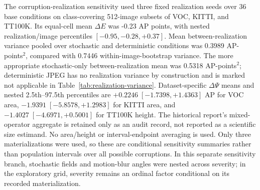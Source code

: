 \documentclass[10pt]{article}
\newcommand{\DeltaE}{\Delta E}
\newcommand{\DeltaPsi}{\Delta\Psi}
\begin{document}
The corruption-realization sensitivity used three fixed realization seeds over
36 base conditions on class-covering 512-image subsets of VOC, KITTI, and
TT100K. Its equal-cell mean $\DeltaE$ was -0.23 AP points, with nested
realization/image percentiles $[-0.95,-0.28,+0.37]$. Mean between-realization
variance pooled over stochastic and deterministic conditions was 0.3989
AP-points$^2$, compared with 0.7446 within-image-bootstrap variance. The more
appropriate stochastic-only between-realization mean was 0.5318
AP-points$^2$; deterministic JPEG has no realization variance by construction
and is marked not applicable in Table~\ref{tab:realization-variance}. Dataset-specific
$\DeltaPsi$ means and nested 2.5th--97.5th percentiles are
$+0.2246\;[-1.7398,+1.4363]$ AP for VOC area,
$-1.9391\;[-5.8578,+1.2983]$ for KITTI area, and
$-1.4027\;[-4.6971,+0.5001]$ for TT100K height. The historical report's
mixed-operator aggregate is retained only as an audit record, not reported as a
scientific size estimand. No area/height or interval-endpoint averaging is used.
Only three materializations were used, so these are
conditional sensitivity summaries rather than population intervals over all
possible corruptions. In this separate sensitivity branch, stochastic fields
and motion-blur angles were nested across severity; in the exploratory grid,
severity remains an ordinal factor conditional on its recorded materialization.

\begin{table}[htbp]
\centering
\caption{Realization-specific direct interactions. All-object $\Delta E$ uses
36 cells per label. Area $\DeltaPsi$ uses the 24 VOC/KITTI cells and height
$\DeltaPsi$ the 12 TT100K cells per label; the two operators are not pooled.
SD is the descriptive standard deviation across three fixed labels.}
\label{tab:realization-seeds}
\small
\resizebox{0.82\textwidth}{!}{}
\end{table}

\begin{table}[htbp]
\centering
\caption{Per-corruption realization sensitivity. Variances are in squared AP
points. JPEG is deterministic and is excluded from the stochastic-only mean.}
\label{tab:realization-variance}
\small
\resizebox{0.92\textwidth}{!}{}
\end{table}

\begin{table}[htbp]
\centering
\caption{Scope and uncertainty target of the four conditional evidence layers.
The reported intervals are not interchangeable estimates of one parameter.}
\label{tab:conditionality-scope}
\scriptsize
\resizebox{\textwidth}{!}{}
\end{table}
\end{document}
